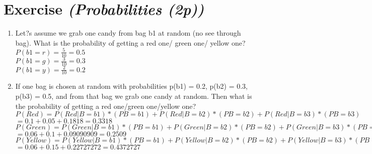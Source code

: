 \documentclass{article}
\author{Sandra Kohl, Jan Hendrik Kirchner, Max Bernhard Ilsen}
\begin{document}
\section{Exercise \textit{(Probabilities (2p))}}
\begin{enumerate}
    \item Let?s assume we grab one candy from bag b1 at random (no see through bag). What is the probability of getting a red one/ green one/ yellow one? \\
	$P(b1 = r) = \frac{5}{10} = 0.5$ \\
	$P(b1 = g) = \frac{3}{10} = 0.3$ \\
	$P(b1 = y) = \frac{2}{10} = 0.2$ \\
   \item If one bag is chosen at random with probabilities p(b1) = 0.2, p(b2) = 0.3, p(b3) = 0.5, and from that bag we grab one candy at random. Then what is the probability of getting a red one/green one/yellow one? \\
	$P(Red) = P(Red | B = b1)*(PB = b1) + P(Red | B = b2)*(PB = b2) + P(Red | B = b3)*(PB = b3)$ \\
	$= 0.1 +  0.05 + 0.1818 = \mathbf{0.3318}$\\
	$P(Green) = P(Green | B = b1)*(PB = b1) + P(Green | B = b2)*(PB = b2) + P(Green | B = b3)*(PB = b3)$ \\
	$= 0.06 +  0.1 + 0.09090909 = \mathbf{0.2509}$\\
	$P(Yellow) = P(Yellow | B = b1)*(PB = b1) + P(Yellow | B = b2)*(PB = b2) + P(Yellow | B = b3)*(PB = b3)$ \\
	$= 0.06 +  0.15 + 0.22727272 = \mathbf{0.4372727}$\\
\end{enumerate}
\end{document}
